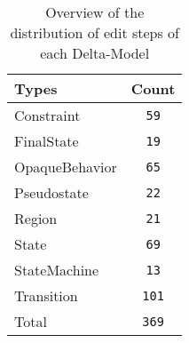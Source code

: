 \begin{table} 
 \center 
 \small 
\begin{tabular}{|l|c|}
\hline
Types & Count\\ 
  \hline 
Constraint & \texttt{59}\\ 
  \hline 
FinalState & \texttt{19}\\ 
  \hline 
OpaqueBehavior & \texttt{65}\\ 
  \hline 
Pseudostate & \texttt{22}\\ 
  \hline 
Region & \texttt{21}\\ 
  \hline 
State & \texttt{69}\\ 
  \hline 
StateMachine & \texttt{13}\\ 
  \hline 
Transition & \texttt{101}\\ 
  \hline 
Total & \texttt{369}\\ 
  \hline 
\end{tabular}
\caption[Overview: Delta-Models]{Overview of the distribution of edit steps of each Delta-Model}
\end{table}

